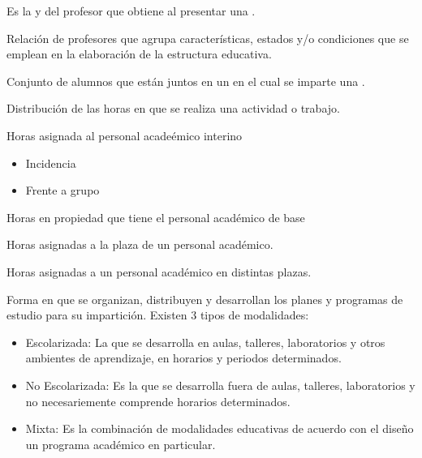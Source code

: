 \begin{bGlosario}
 	 Es la  y  del profesor que obtiene al presentar una .
 	
 	 Relación de profesores que agrupa características, estados y/o condiciones que se emplean en la elaboración de la estructura educativa.

	 Conjunto de alumnos que están juntos en un  en el cual se imparte una .
	
	 Distribución de las horas en que se realiza una actividad o trabajo.
	
	 Horas asignada al personal acadeémico interino
		\begin{itemize}
			\item Incidencia
			\item Frente a grupo
		\end{itemize}
	
	 Horas en propiedad que tiene el personal académico de base
	
	 Horas asignadas a la plaza de un personal académico.
	
	 Horas asignadas a un personal académico en distintas plazas.
		
	 Forma en que se organizan, distribuyen y desarrollan los planes y programas de estudio para su impartición. Existen 3 tipos de modalidades:
	
	\begin{itemize}
		\item Escolarizada: La que se desarrolla en aulas, talleres, laboratorios y otros ambientes de aprendizaje, en horarios y periodos determinados.
		\item No Escolarizada: Es la que se desarrolla fuera de aulas,
		talleres, laboratorios y no necesariemente comprende horarios determinados.
		\item Mixta: Es la combinación de modalidades educativas de
		acuerdo con el diseño un programa académico en particular.
	\end{itemize}


\end{bGlosario}
